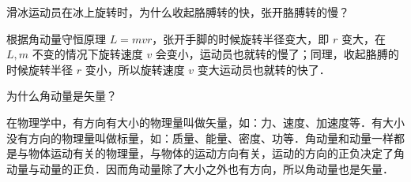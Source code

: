 \begin{example}{}
滑冰运动员在冰上旋转时，为什么收起胳膊转的快，张开胳膊转的慢？

根据角动量守恒原理 $L=mvr$，张开手脚的时候旋转半径变大，即 $r$ 变大，在 $L,m$ 不变的情况下旋转速度 $v$ 会变小，运动员也就转的慢了；同理，收起胳膊的时候旋转半径 $r$ 变小，所以旋转速度 $v$ 变大运动员也就转的快了．
\end{example}
\begin{example}{}
为什么角动量是矢量？

在物理学中，有方向有大小的物理量叫做矢量，如：力、速度、加速度等．有大小没有方向的物理量叫做标量，如：质量、能量、密度、功等．角动量和动量一样都是与物体运动有关的物理量，与物体的运动方向有关，运动的方向的正负决定了角动量与动量的正负．因而角动量除了大小之外也有方向，所以角动量也是矢量．
\end{example}

